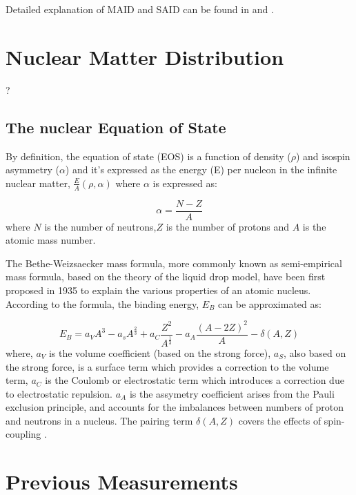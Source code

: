 \indent Detailed explanation of MAID and SAID can be found in \cite{maid} and \cite{said, arndt}.

\section{Nuclear Matter Distribution}

\indent ?

\subsection{The nuclear Equation of State}

\indent By definition, the equation of state (EOS) is a function of density ($\rho$) and isospin asymmetry ($\alpha$) and it's expressed as the energy (E) per nucleon in the infinite nuclear matter, $\frac{E}{A} (\rho,\alpha)$ where $\alpha$ is expressed as:

\begin{equation}
\alpha=\frac{N-Z}{A}
\end{equation}
where $N$ is the number of neutrons,$Z$ is the number of protons and $A$ is the atomic mass number.

\indent The Bethe-Weizsaecker mass formula, more commonly known as semi-empirical mass formula, based on the theory of the liquid drop model, have been first proposed in 1935 to explain the various properties of an atomic nucleus. According to the formula, the binding energy, $E_{B}$ can be approximated as:

\begin{equation}
E_{B}=a_{V}A^{3}-a_{s}A^{\frac{2}{3}}+a_{C}\frac{Z^{2}}{A^{\frac{1}{3}}}-a_{A}\frac{(A-2Z)^{2}}{A}-\delta(A,Z)
\end{equation}
where, $a_{V}$ is the volume coefficient (based on the strong force), $a_{S}$, also based on the strong force, is a surface term which provides a correction to the volume term, $a_{C}$ is the Coulomb or electrostatic term which introduces a correction due to electrostatic repulsion. $a_{A}$ is the assymetry coefficient arises from the Pauli exclusion principle, and accounts for the imbalances between numbers of proton and neutrons in a nucleus. The pairing term $\delta(A,Z)$ covers the effects of spin-coupling \cite{bertulani}.

\indent

\section{Previous Measurements}


